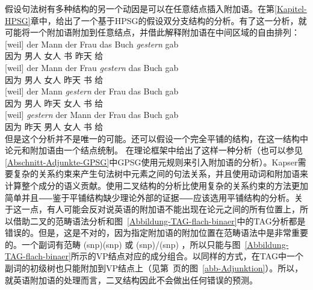 假设句法树有多种结构的另一个动因是可以在任意结点插入附加语。在第\ref{Kapitel-HPSG}章中，给出了一个基于HPSG的假设双分支结构的分析。有了这一分析，就可能将一个附加语附加到任意结点，并借此解释附加语在中间区域的自由排列：
\eal
\ex 
\gll {}[weil] der Mann der Frau das Buch \emph{gestern} gab\\
	 {}\spacebr{}因为  男人  女人  书 昨天 给\\
\ex 
\gll {}[weil] der Mann der Frau \emph{gestern} das Buch gab\\
	 {}\spacebr{}因为  男人  女人 昨天  书 给\\
\ex 
\gll {}[weil] der Mann \emph{gestern} der Frau das Buch gab\\
	 {}\spacebr{}因为  男人 昨天  女人  书 给\\
\ex 
\gll {}[weil] \emph{gestern} der Mann der Frau das Buch gab\\
	 {}\spacebr{}因为 昨天  男人  女人  书 给\\
\zl
但是这个分析并不是唯一的可能。还可以假设一个完全平铺的结构，在这一结构中论元和附加语由一个结点统制。 \citet{Kasper94a}在\hpsgc 理论框架中给出了这样一种分析（也可以参见\ref{Abschnitt-Adjunkte-GPSG}中GPSG使用元规则来引入附加语的分析）。Kapser需要复杂的关系约束来产生句法树中元素之间的句法关系，并且使用动词和附加语来计算整个成分的语义贡献。使用二叉结构的分析比使用复杂的关系约束的方法更加简单并且⸺鉴于平铺结构缺少理论外部的证据⸺应该选用平铺结构的分析。关于这一点，有人可能会反对说英语的附加语不能出现在论元之间的所有位置上，所以借助二叉的范畴语法分析和图~\ref{Abbildung-TAG-flach-binaer}中的TAG分析都是错误的。但是，这是不对的，因为指定附加语的附加位置在范畴语法中是非常重要的。一个副词有范畴 (s\bs np)\bs (s\bs np) 或 (s\bs np)/(s\bs np) ，所以只能与图~\ref{Abbildung-TAG-flach-binaer}所示的VP结点对应的成分组合。以同样的方式，在TAG中一个副词的初级树也只能附加到VP结点上（见第~\pageref{abb-Adjunktion}页的图~\ref{abb-Adjunktion}）。所以，就英语附加语的处理而言，二叉结构因此不会做出任何错误的预测。
